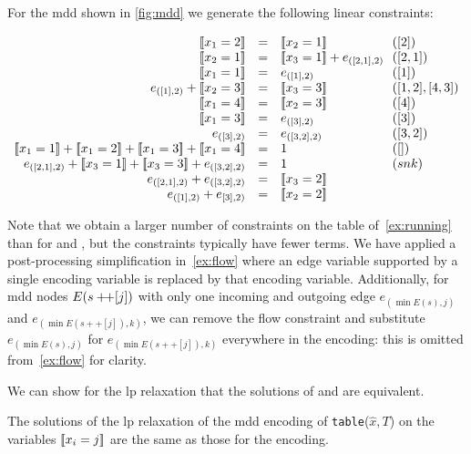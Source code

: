 \documentclass[a4paper,UKenglish,cleveref,autoref,thm-restate]{lipics-v2021}
\newcommand{\relaxation}{\acrshort{lp} relaxation\xspace}
\begin{document}
\begin{example} \label{ex:flow}
For the \gls{mdd} shown in \cref{fig:mdd}
we generate the following linear constraints:

\begin{equation*}
\begin{array}{rcl@{~~}l}
\be{1}{2} &= &\be{2}{1} & ([2])\\
\be{2}{1} &= &\be{3}{1} + e_{([2,1],2)} &([2,1]) \\
\be{1}{1} &= &e_{([1],2)} & ([1])\\
e_{([1],2)} + \be{2}{3} &=& \be{3}{3} & ([1,2], [4,3]) \\
\be{1}{4} & = & \be{2}{3} & ([4]) \\
\be{1}{3} &=& e_{([3],2)}  & ([3])\\
e_{([3],2)} &=& e_{([3,2],2)} & ([3,2])\\
\be{1}{1} + \be{1}{2} + \be{1}{3} + \be{1}{4} &= &1 & ([]) \\
e_{([2,1],2)} + \be{3}{1} + \be{3}{3} + e_{([3,2],2)} &=& 1 & (snk)\\
e_{([2,1],2)} + e_{([3,2],2)} & = &\be{3}{2} \\
e_{([1],2)} + e_{[3],2)} & = &\be{2}{2} \\
\end{array}
\end{equation*}

Note that we obtain a larger number of constraints on the table of~\cref{ex:running} than for \baseGleb and \baseBool, but the constraints typically have fewer terms. We have applied a post-processing simplification in~\cref{ex:flow} where an edge variable supported by a single encoding variable is replaced by that encoding variable. Additionally, for \gls{mdd} nodes $E(s +\!\!+ [j])$ with only one incoming and outgoing edge $e_{(\min E(s), j)}$ and $e_{(\min E(s ++ [j]), k)}$, we can remove the flow constraint and substitute $e_{(\min E(s), j)}$ for $e_{(\min E(s ++ [j]), k)}$ everywhere in the encoding: this is omitted from~\cref{ex:flow} for clarity.
\end{example}

We can show for the \relaxation that the solutions of \baseMdd and \baseBool are equivalent.  

\begin{theorem}
    The solutions of the \relaxation of the \gls{mdd} encoding of \texttt{table}($\hat{x},T$) on the variables $[\![x_i = j]\!]$ are the same as those for the \baseBool encoding.
\end{theorem}
\end{document}

